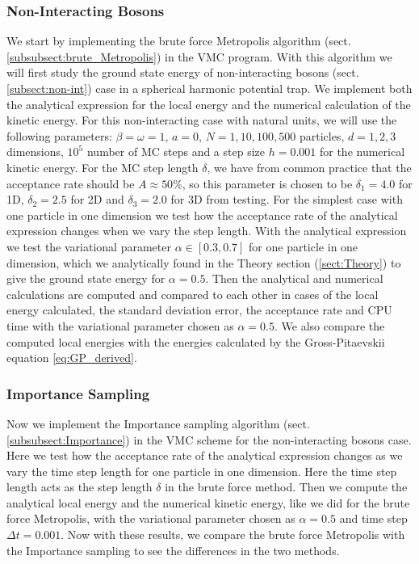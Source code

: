 \documentclass[12pt,a4paper,english]{article}
\begin{document}
\subsubsection{Non-Interacting Bosons}
\label{subsubsect:Coding_non-int}
We start by implementing the brute force Metropolis algorithm (sect. \ref{subsubsect:brute_Metropolis}) in the VMC program. With this algorithm we will first study the ground state energy of non-interacting bosons (sect. \ref{subsect:non-int}) case in a spherical harmonic potential trap. We implement both the analytical expression for the local energy and the numerical calculation of the kinetic energy. For this non-interacting case with natural units, we will use the following parameters: $\beta=\omega=1$, $a=0$, $N=1,10,100,500$ particles, $d=1,2,3$ dimensions, $10^5$ number of MC steps and a step size $h=0.001$ for the numerical kinetic energy. For the MC step length $\delta$, we have from common practice that the acceptance rate should be $A\approx50$\%, so this parameter is chosen to be $\delta_1=4.0$ for 1D, $\delta_2=2.5$ for 2D and $\delta_3=2.0$ for 3D from testing. For the simplest case with one particle in one dimension we test how the acceptance rate of the analytical expression changes when we vary the step length. With the analytical expression we test the variational parameter $\alpha\in[0.3,0.7]$ for one particle in one dimension, which we analytically found in the Theory section (\ref{sect:Theory}) to give the ground state energy for $\alpha=0.5$. Then the analytical and numerical calculations are computed and compared to each other in cases of the local energy calculated, the standard deviation error, the acceptance rate and CPU time with the variational parameter chosen as $\alpha=0.5$. We also compare the computed local energies with the energies calculated by the Gross-Pitaevskii equation \ref{eq:GP_derived}.
 
\subsubsection{Importance Sampling}
\label{subsubsect:Coding_importance}
Now we implement the Importance sampling algorithm (sect. \ref{subsubsect:Importance}) in the VMC scheme for the non-interacting bosons case. Here we test how the acceptance rate of the analytical expression changes as we vary the time step length for one particle in one dimension. Here the time step length acts as the step length $\delta$ in the brute force method. Then we compute the analytical local energy and the numerical kinetic energy, like we did for the brute force Metropolis, with the variational parameter chosen as $\alpha=0.5$ and time step $\Delta t=0.001$. Now with these results, we compare the brute force Metropolis with the Importance sampling to see the differences in the two methods.
\end{document}
